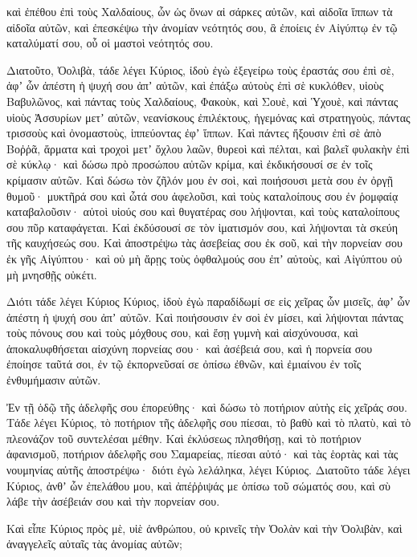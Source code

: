 {καὶ ἐπέθου ἐπὶ τοὺς Χαλδαίους, ὧν ὡς ὄνων αἱ σάρκες αὐτῶν, καὶ αἰδοῖα ἵππων τὰ αἰδοῖα αὐτῶν,
καὶ ἐπεσκέψω τὴν ἀνομίαν νεότητός σου, ἃ ἐποίεις ἐν Αἰγύπτῳ ἐν τῷ καταλύματί σου, οὗ οἱ μαστοὶ νεότητός σου.
\par }{\PP {}Διατοῦτο, Ὀολιβὰ, τάδε λέγει Κύριος, ἰδοὺ ἐγὼ ἐξεγείρω τοὺς ἐραστάς σου ἐπὶ σὲ, ἀφʼ ὧν ἀπέστη ἡ ψυχή σου ἀπʼ αὐτῶν, καὶ ἐπάξω αὐτοὺς ἐπὶ σὲ κυκλόθεν,
υἱοὺς Βαβυλῶνος, καὶ πάντας τοὺς Χαλδαίους, Φακοὺκ, καὶ Σουὲ, καὶ Ὑχουὲ, καὶ πάντας υἱοὺς Ἀσσυρίων μετʼ αὐτῶν, νεανίσκους ἐπιλέκτους, ἡγεμόνας καὶ στρατηγοὺς, πάντας τρισσοὺς καὶ ὀνομαστοὺς, ἱππεύοντας ἐφʼ ἵππων.
Καὶ πάντες ἥξουσιν ἐπὶ σὲ ἀπὸ Βοῤῥᾶ, ἅρματα καὶ τροχοὶ μετʼ ὄχλου λαῶν, θυρεοὶ καὶ πέλται, καὶ βαλεῖ φυλακὴν ἐπὶ σὲ κύκλῳ·
καὶ δώσω πρὸ προσώπου αὐτῶν κρίμα, καὶ ἐκδικήσουσί σε ἐν τοῖς κρίμασιν αὐτῶν. Καὶ δώσω τὸν ζῆλόν μου ἐν σοὶ, καὶ ποιήσουσι μετὰ σου ἐν ὀργῇ θυμοῦ· μυκτῆρά σου καὶ ὦτά σου ἀφελοῦσι, καὶ τοὺς καταλοίπους σου ἐν ῥομφαίᾳ καταβαλοῦσιν· αὐτοὶ υἱούς σου καὶ θυγατέρας σου λήψονται, καὶ τοὺς καταλοίπους σου πῦρ καταφάγεται.
Καὶ ἐκδύσουσί σε τὸν ἱματισμόν σου, καὶ λήψονται τὰ σκεύη τῆς καυχήσεώς σου.
Καὶ ἀποστρέψω τὰς ἀσεβείας σου ἐκ σοῦ, καὶ τὴν πορνείαν σου ἐκ γῆς Αἰγύπτου· καὶ οὐ μὴ ἄρῃς τοὺς ὀφθαλμούς σου ἐπʼ αὐτοὺς, καὶ Αἰγύπτου οὐ μὴ μνησθῇς οὐκέτι.
\par }{\PP {}Διότι τάδε λέγει Κύριος Κύριος, ἰδοὺ ἐγὼ παραδίδωμί σε εἰς χεῖρας ὧν μισεῖς, ἀφʼ ὧν ἀπέστη ἡ ψυχή σου ἀπʼ αὐτῶν.
Καὶ ποιήσουσιν ἐν σοὶ ἑν μίσει, καὶ λήψονται πάντας τοὺς πόνους σου καὶ τοὺς μόχθους σου, καὶ ἔσῃ γυμνὴ καὶ αἰσχύνουσα, καὶ ἀποκαλυφθήσεται αἰσχύνη πορνείας σου· καὶ ἀσέβειά σου, καὶ ἡ πορνεία σου
ἐποίησε ταῦτά σοι, ἐν τῷ ἐκπορνεῦσαί σε ὀπίσω ἐθνῶν, καὶ ἐμιαίνου ἐν τοῖς ἐνθυμήμασιν αὐτῶν.
\par }{\PP {}Ἐν τῇ ὁδῷ τῆς ἀδελφῆς σου ἐπορεύθης· καὶ δώσω τὸ ποτήριον αὐτὴς εἰς χεῖράς σου.
Τάδε λέγει Κύριος, τὸ ποτήριον τῆς ἀδελφῆς σου πίεσαι, τὸ βαθὺ καὶ τὸ πλατὺ, καὶ τὸ πλεονάζον τοῦ συντελέσαι μέθην.
Καὶ ἐκλύσεως πλησθήσῃ, καὶ τὸ ποτήριον ἀφανισμοῦ, ποτήριον ἀδελφῆς σου Σαμαρείας, πίεσαι αὐτό·
καὶ τὰς ἑορτὰς καὶ τὰς νουμηνίας αὐτῆς ἀποστρέψω· διότι ἐγὼ λελάληκα, λέγει Κύριος.
Διατοῦτο τάδε λέγει Κύριος, ἀνθʼ ὧν ἐπελάθου μου, καὶ ἀπέῤῥιψάς με ὀπίσω τοῦ σώματός σου, καὶ σὺ λάβε τὴν ἀσέβειάν σου καὶ τὴν πορνείαν σου.
\par }{\PP {}Καὶ εἶπε Κύριος πρὸς μὲ, υἱὲ ἀνθρώπου, οὐ κρινεῖς τὴν Ὀολὰν καὶ τὴν Ὀολιβὰν, καὶ ἀναγγελεῖς αὐταῖς τὰς ἀνομίας αὐτῶν;
}
